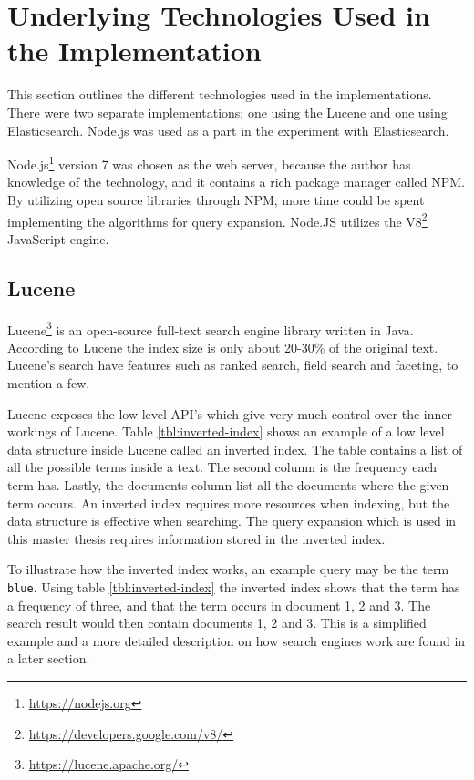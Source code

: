 \section{Underlying Technologies Used in the Implementation}
This section outlines the different technologies used in the implementations.
There were two separate implementations;
one using the Lucene and one using Elasticsearch.
Node.js was used as a part in the experiment with Elasticsearch.

Node.js\footnote{\url{https://nodejs.org}} version 7 was chosen as the web server,
because the author has knowledge of the technology,
and it contains a rich package manager called NPM.
By utilizing open source libraries through NPM, more time could be spent implementing the algorithms for query expansion.
Node.JS utilizes the V8\footnote{\url{https://developers.google.com/v8/}} JavaScript engine.

\subsection{Lucene}
Lucene\footnote{\url{https://lucene.apache.org/}} is an open-source full-text search engine library written in Java.
According to Lucene \cite{lucene-core} the index size is only about 20-30\% of the original text.
Lucene's search have features such as ranked search, field search and faceting, to mention a few.

Lucene exposes the low level API's which give very much control over the inner workings of Lucene.
Table \ref{tbl:inverted-index} shows an example of a low level data structure inside Lucene called an inverted index.
The table contains a list of all the possible terms inside a text.
The second column is the frequency each term has.
Lastly, the documents column list all the documents where the given term occurs.
An inverted index requires more resources when indexing,
but the data structure is effective when searching.
The query expansion which is used in this master thesis requires information stored in the inverted index.

To illustrate how the inverted index works, an example query may be the term \texttt{blue}.
Using table \ref{tbl:inverted-index} the inverted index shows that the term has a frequency of three,
and that the term occurs in document 1, 2 and 3.
The search result would then contain documents 1, 2 and 3.
This is a simplified example and a more detailed description on how search engines work are found in a later section.

